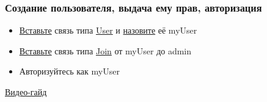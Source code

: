 \subsubsection{Создание пользователя, выдача ему прав, авторизация}
\begin{itemize}
  \item \hyperlink{DeepCase.InsertLink.Description}{Вставьте} связь типа \hyperlink{Core.User.Description}{User} и \hyperlink{FAQ.HowToSetName}{назовите} её myUser
  \item \hyperlink{DeepCase.InsertLink.Description}{Вставьте} связь типа \hyperlink{Core.Join.Description}{Join} от myUser до admin
  \item Авторизуйтесь как myUser
\end{itemize}
\href{https://youtu.be/TeGln__84y8}{Видео-гайд}

